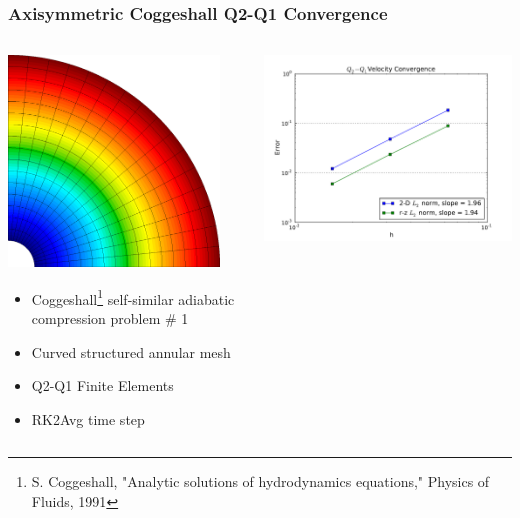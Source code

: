 \documentclass[notes=hide,8pt,xcolor=svgnames]{beamer}
\begin{document}
\begin{frame}
\frametitle{Axisymmetric Coggeshall Q2-Q1 Convergence}
\begin{columns}
\begin{column}{0.4\textwidth}
\includegraphics[width=0.9\textwidth]{figures/CoggMesh_Q2Q1.png}
\begin{itemize}
\item Coggeshall\footnote[1]{\tiny S. Coggeshall, "Analytic solutions of
hydrodynamics equations," Physics of Fluids, 1991} self-similar adiabatic
compression problem \# 1
\item Curved structured annular mesh
\item Q2-Q1 Finite Elements
\item RK2Avg time step
\end{itemize}
\bigskip
\end{column}
\begin{column}{0.45\textwidth}
\includegraphics[width=1\textwidth]{figures/CoggErrorQ2Q1_V.pdf}

\end{column}
\end{columns}
\end{frame}
\end{document}
